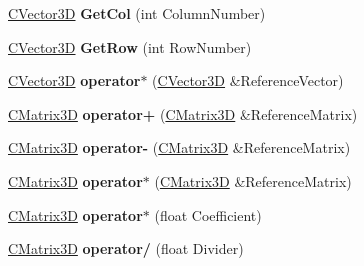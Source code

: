 \begin{DoxyCompactItemize}
\item 
\hyperlink{struct_c_vector3_d}{C\+Vector3D} {\bfseries Get\+Col} (int Column\+Number)\hypertarget{struct_c_matrix3_d_a025e42aa557163781a6bd30d753095aa}{}\label{struct_c_matrix3_d_a025e42aa557163781a6bd30d753095aa}

\item 
\hyperlink{struct_c_vector3_d}{C\+Vector3D} {\bfseries Get\+Row} (int Row\+Number)\hypertarget{struct_c_matrix3_d_a8b1bffc33043d7989df6a4df006b3eb9}{}\label{struct_c_matrix3_d_a8b1bffc33043d7989df6a4df006b3eb9}

\item 
\hyperlink{struct_c_vector3_d}{C\+Vector3D} {\bfseries operator$\ast$} (\hyperlink{struct_c_vector3_d}{C\+Vector3D} \&Reference\+Vector)\hypertarget{struct_c_matrix3_d_a90b5eb6db4a2f7faf45812ec3464ea3a}{}\label{struct_c_matrix3_d_a90b5eb6db4a2f7faf45812ec3464ea3a}

\item 
\hyperlink{struct_c_matrix3_d}{C\+Matrix3D} {\bfseries operator+} (\hyperlink{struct_c_matrix3_d}{C\+Matrix3D} \&Reference\+Matrix)\hypertarget{struct_c_matrix3_d_a0b41873eeb0e460d42706625c017454c}{}\label{struct_c_matrix3_d_a0b41873eeb0e460d42706625c017454c}

\item 
\hyperlink{struct_c_matrix3_d}{C\+Matrix3D} {\bfseries operator-\/} (\hyperlink{struct_c_matrix3_d}{C\+Matrix3D} \&Reference\+Matrix)\hypertarget{struct_c_matrix3_d_a230bdd9fe359e23c4111b8684e05d5bf}{}\label{struct_c_matrix3_d_a230bdd9fe359e23c4111b8684e05d5bf}

\item 
\hyperlink{struct_c_matrix3_d}{C\+Matrix3D} {\bfseries operator$\ast$} (\hyperlink{struct_c_matrix3_d}{C\+Matrix3D} \&Reference\+Matrix)\hypertarget{struct_c_matrix3_d_a4335d6c0d9ae960e33c6685d5035daf2}{}\label{struct_c_matrix3_d_a4335d6c0d9ae960e33c6685d5035daf2}

\item 
\hyperlink{struct_c_matrix3_d}{C\+Matrix3D} {\bfseries operator$\ast$} (float Coefficient)\hypertarget{struct_c_matrix3_d_a39015d8b25349c80d68ddd2001657223}{}\label{struct_c_matrix3_d_a39015d8b25349c80d68ddd2001657223}

\item 
\hyperlink{struct_c_matrix3_d}{C\+Matrix3D} {\bfseries operator/} (float Divider)\hypertarget{struct_c_matrix3_d_a1e8b6fbe6a5d1ecd1a4b20fb6de85c73}{}\label{struct_c_matrix3_d_a1e8b6fbe6a5d1ecd1a4b20fb6de85c73}


\end{DoxyCompactItemize}
